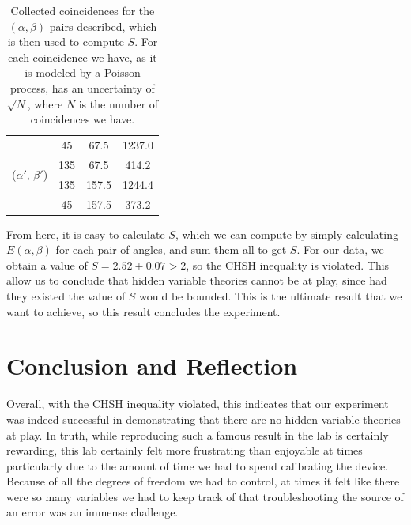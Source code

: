 \documentclass[10pt]{article}
\begin{document}
\begin{table}
\begin{tabular}{|c|c|c|c|}
    \multirow{4}{*}{($\alpha'$, $\beta'$)} & 45                      & 67.5                                         & 1237.0                \\ \cline{2-4} 
                                           & 135                     & 67.5                                         & 414.2                 \\ \cline{2-4} 
                                           & 135                     & 157.5                                        & 1244.4                \\ \cline{2-4} 
                                           & 45                      & 157.5                                        & 373.2                 \\ \hline
    \end{tabular}
    \caption{Collected coincidences for the \( (\alpha, \beta) \) pairs described, which is then used to
		compute \( S \). For each coincidence we
	have, as it is modeled by a Poisson process, has an uncertainty of \( \sqrt{N} \), where \( N \) is the
number of coincidences we have.}
\label{exp-data}
\end{table}

	From here, it is easy to calculate \( S \), which we can compute by simply calculating \( E(\alpha,
	\beta)\) for each pair of angles, and sum them all to get \( S \). For our data, we obtain a value of \(
	S = 2.52 \pm 0.07 > 2\), so the CHSH inequality is violated. This allow us to conclude that hidden
	variable theories cannot be at play, since had they existed the value of \( S \) would be bounded. This
	is the ultimate result that we want to achieve, so this result concludes the experiment.    


	\section{Conclusion and Reflection}

	Overall, with the CHSH inequality violated, this indicates that our experiment was indeed successful in
	demonstrating that there are no hidden variable theories at play. In truth, while reproducing such a
	famous result in the lab is certainly rewarding, this lab certainly felt more frustrating than enjoyable
	at times particularly due to the amount of time we had to spend calibrating the device. Because of all
	the degrees of freedom we had to control, at times it felt like there were so many variables we had to
	keep track of that troubleshooting the source of an error was an immense challenge. 
\end{document}
